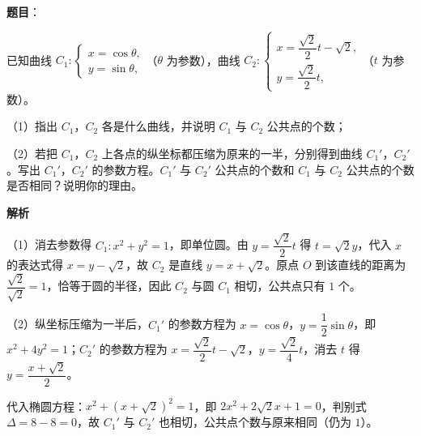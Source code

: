 \begin{answer}

\textbf{题目}：

已知曲线 $C_1:\begin{cases}x=\cos\theta,\\ y=\sin\theta,\end{cases}$（$\theta$ 为参数），曲线 $C_2:\begin{cases}x=\dfrac{\sqrt2}2t-\sqrt2,\\ y=\dfrac{\sqrt2}2t,\end{cases}$（$t$ 为参数）。

（1）指出 $C_1$，$C_2$ 各是什么曲线，并说明 $C_1$ 与 $C_2$ 公共点的个数；

（2）若把 $C_1$，$C_2$ 上各点的纵坐标都压缩为原来的一半，分别得到曲线 $C_1'$，$C_2'$。写出 $C_1'$，$C_2'$ 的参数方程。$C_1'$ 与 $C_2'$ 公共点的个数和 $C_1$ 与 $C_2$ 公共点的个数是否相同？说明你的理由。

\textbf{解析}

（1）消去参数得 $C_1:x^2+y^2=1$，即单位圆。由 $y=\dfrac{\sqrt2}2t$ 得 $t=\sqrt2y$，代入 $x$ 的表达式得 $x=y-\sqrt2$，故 $C_2$ 是直线 $y=x+\sqrt2$。原点 $O$ 到该直线的距离为 $\dfrac{\sqrt2}{\sqrt2}=1$，恰等于圆的半径，因此 $C_2$ 与圆 $C_1$ 相切，公共点只有 $1$ 个。

（2）纵坐标压缩为一半后，$C_1'$ 的参数方程为 $x=\cos\theta$，$y=\dfrac12\sin\theta$，即 $x^2+4y^2=1$；$C_2'$ 的参数方程为 $x=\dfrac{\sqrt2}2t-\sqrt2$，$y=\dfrac{\sqrt2}4t$，消去 $t$ 得 $y=\dfrac{x+\sqrt2}2$。

代入椭圆方程：$x^2+(x+\sqrt2)^2=1$，即 $2x^2+2\sqrt2x+1=0$，判别式 $\Delta=8-8=0$，故 $C_1'$ 与 $C_2'$ 也相切，公共点个数与原来相同（仍为 $1$）。


\end{answer}
